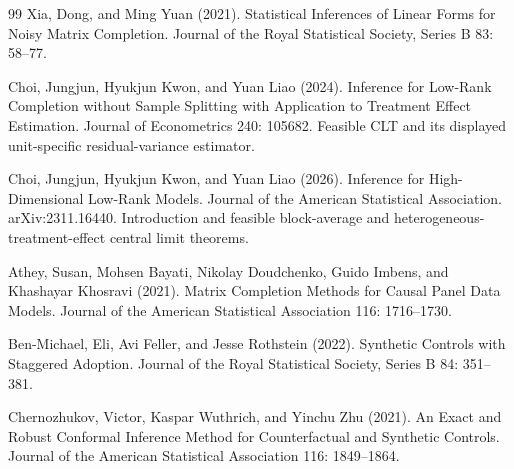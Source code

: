 \documentclass{article}
\begin{document}
\begin{thebibliography}{99}
   Xia, Dong, and Ming Yuan (2021). Statistical Inferences of Linear Forms for Noisy Matrix Completion. Journal of the Royal Statistical Society, Series B 83: 58--77.

   Choi, Jungjun, Hyukjun Kwon, and Yuan Liao (2024). Inference for Low-Rank Completion without Sample Splitting with Application to Treatment Effect Estimation. Journal of Econometrics 240: 105682. Feasible CLT and its displayed unit-specific residual-variance estimator.

   Choi, Jungjun, Hyukjun Kwon, and Yuan Liao (2026). Inference for High-Dimensional Low-Rank Models. Journal of the American Statistical Association. arXiv:2311.16440. Introduction and feasible block-average and heterogeneous-treatment-effect central limit theorems.

   Athey, Susan, Mohsen Bayati, Nikolay Doudchenko, Guido Imbens, and Khashayar Khosravi (2021). Matrix Completion Methods for Causal Panel Data Models. Journal of the American Statistical Association 116: 1716--1730.

   Ben-Michael, Eli, Avi Feller, and Jesse Rothstein (2022). Synthetic Controls with Staggered Adoption. Journal of the Royal Statistical Society, Series B 84: 351--381.

   Chernozhukov, Victor, Kaspar Wuthrich, and Yinchu Zhu (2021). An Exact and Robust Conformal Inference Method for Counterfactual and Synthetic Controls. Journal of the American Statistical Association 116: 1849--1864.

\end{thebibliography}
\end{document}
